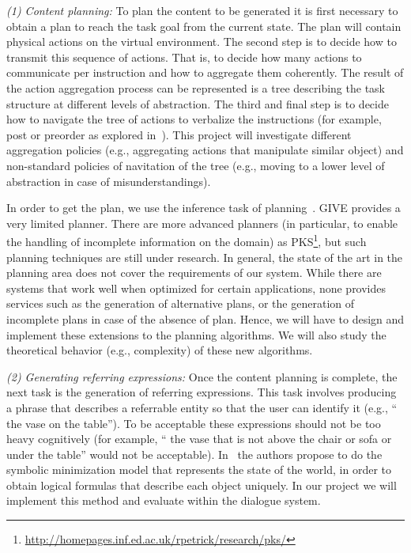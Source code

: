 \emph{(1) Content planning:} To plan the content to be generated it is first
necessary to obtain a plan to reach the task goal from the current state.
The plan will contain physical actions on the virtual environment. The second
step is to decide how to transmit this sequence of actions. That is, to decide
how many actions to communicate per instruction and how to aggregate them
coherently. The result of the action aggregation process can be represented is a
tree describing the task structure at different levels of abstraction. The third
and final step is to decide how to navigate the tree of actions to verbalize the
instructions (for example, post or preorder as
explored in~\cite{foster-etal-ijcai2009}). This project will investigate
different aggregation policies (e.g., aggregating actions that
manipulate similar object) and non-standard policies of navitation of the tree
(e.g., moving to a lower level of abstraction in case of misunderstandings).

In order to get the plan, we use the inference task of planning~\cite{nau04}.
GIVE provides a very limited planner. There are more advanced planners
(in particular, to enable the handling of incomplete information on the domain)
as PKS\footnote{\url{http://homepages.inf.ed.ac.uk/rpetrick/research/pks/}},
but such planning techniques are still under research. In general,
the state of the art in the planning area does not cover the requirements of our
system. While there are systems that work well when optimized for certain
applications, none provides services such as the generation of alternative
plans, or the generation of incomplete plans in case of the absence of plan.
Hence, we will have to design and implement these extensions to the planning
algorithms. We will also study the theoretical behavior (e.g., complexity) of
these new algorithms. 

\emph{(2) Generating referring expressions:} Once the content planning is
complete, the next task is the generation of referring expressions. This task
involves
producing a phrase that describes a referrable entity so that the user can
identify it (e.g., `` the vase on the table''). To be
acceptable these expressions should not be too heavy cognitively (for
example, `` the vase that is not above the chair or sofa or under the
table'' would not be acceptable). In~\cite{AKS08} the authors propose to
do the symbolic minimization model that represents the state of the world, in
order to obtain logical formulas that describe each object uniquely. In our
project we
will implement this method and evaluate within the dialogue system.

